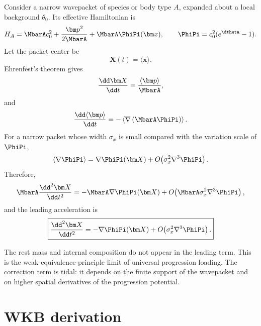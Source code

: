 \documentclass[12pt]{article}
\begin{document}
Consider a narrow wavepacket of species or body type \(A\), expanded about a local background \(\theta_0\).  Its effective Hamiltonian is
\begin{equation}
    H_A = \MbarA c_0^2 + \frac{\bm p^2}{2\MbarA}+\MbarA\PhiPi(\bm x),
    \qquad
    \PhiPi=c_0^2(e^{\dtheta}-1).
    \label{eq:Hamiltonian}
\end{equation}
Let the packet center be
\begin{equation}
    \bm X(t)=\langle \bm x\rangle.
    \label{eq:packet-center}
\end{equation}
Ehrenfest's theorem gives
\begin{equation}
    \frac{\dd \bm X}{\dd t}=\frac{\langle \bm p\rangle}{\MbarA},
    \label{eq:ehrenfest-velocity}
\end{equation}
and
\begin{equation}
    \frac{\dd\langle \bm p\rangle}{\dd t}
    =-\left\langle \nabla\left(\MbarA\PhiPi\right)\right\rangle.
    \label{eq:ehrenfest-force}
\end{equation}
For a narrow packet whose width \(\sigma_x\) is small compared with the variation scale of \(\PhiPi\),
\begin{equation}
    \left\langle \nabla\PhiPi\right\rangle
    =\nabla\PhiPi(\bm X)+O\!\left(\sigma_x^2\nabla^3\PhiPi\right).
    \label{eq:narrow-packet}
\end{equation}
Therefore,
\begin{equation}
    \MbarA\frac{\dd^2\bm X}{\dd t^2}
    =-\MbarA\nabla\PhiPi(\bm X)+O\!\left(\MbarA\sigma_x^2\nabla^3\PhiPi\right),
    \label{eq:mass-cancels-1}
\end{equation}
and the leading acceleration is
\begin{equation}
    \boxed{
    \frac{\dd^2\bm X}{\dd t^2}=-\nabla\PhiPi(\bm X)
    +O\!\left(\sigma_x^2\nabla^3\PhiPi\right).
    }
    \label{eq:universal-acceleration}
\end{equation}

The rest mass and internal composition do not appear in the leading term. This is the weak-equivalence-principle limit of universal progression loading. The correction term is tidal: it depends on the finite support of the wavepacket and on higher spatial derivatives of the progression potential.
\section{WKB derivation}
\end{document}
